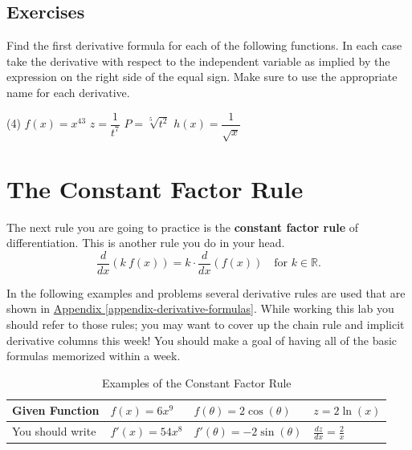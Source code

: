 \documentclass[10pt,oneside,]{book}
\newcommand{\terminology}[1]{\textbf{#1}}
\theoremstyle{plain}
\theoremstyle{definition}
\numberwithin{equation}{section}
\newcommand{\reals}{\mathbb{R}}
\newcommand{\fe}[2]{#1\mathopen{}\left(#2\right)\mathclose{}}
\newcommand{\fd}[1]{#1'}
\newcommand{\lz}[2]{\frac{d#1}{d#2}}
\newcommand{\lzoo}[2]{{\frac{d}{d#1}}{\left(#2\right)}}
\begin{document}
\subsection[Exercises]{Exercises}\label{exercises-33}
\hypertarget{exercisegroup-72}{\null}Find the first derivative formula for each of the following functions.  In each case take the derivative with respect to the independent variable as implied by the expression on the right side of the equal sign.  Make sure to use the appropriate name for each derivative.%
\par
\begin{exercisegroup}(4)
\exercise[1.]\hypertarget{exercise-353}{\null}\(\fe{f}{x}=x^{43}\)%
\exercise[2.]\hypertarget{exercise-354}{\null}\(z=\dfrac{1}{t^{7}}\)%
\exercise[3.]\hypertarget{exercise-355}{\null}\(P=\sqrt[5]{t^2}\)%
\exercise[4.]\hypertarget{exercise-356}{\null}\(\fe{h}{x}=\dfrac{1}{\sqrt{x}}\)%
\end{exercisegroup}
\par\smallskip\noindent
\typeout{************************************************}
\typeout{************************************************}
\section[The Constant Factor Rule]{The Constant Factor Rule}\label{section-constant-factor-rule}
The next rule you are going to practice is the \terminology{constant factor rule} of differentiation.  This is another rule you do in your head. \begin{equation}\lzoo{x}{k\ \fe{f}{x}}=k\cdot\lzoo{x}{\fe{f}{x}}\quad\text{for }k\in\reals\text{.}\label{men-3}\end{equation}%
\par
In the following examples and problems several derivative rules are used that are shown in \hyperref[appendix-derivative-formulas]{Appendix \ref{appendix-derivative-formulas}}.  While working this lab you should refer to those rules; you may want to cover up the chain rule and implicit derivative columns this week!  You should make a goal of having all of the basic formulas memorized within a week.%
\begin{table}
\centering
\caption{Examples of the Constant Factor Rule\label{table-constant-factor-rule}}
\begin{tabular}{l|l|l|l}
\toprule
Given Function&\(\fe{f}{x}=6x^9\)&\(\fe{f}{\theta}=2\fe{\cos}{\theta}\)&\(z=2\fe{\ln}{x}\)\\
\midrule
You should write&\(\fe{\fd{f}}{x}=54x^8\)&\(\fe{\fd{f}}{\theta}=-2\fe{\sin}{\theta}\)&\(\lz{z}{x}=\frac{2}{x}\)\\
\bottomrule
\end{tabular}
\end{table}
\typeout{************************************************}
\typeout{************************************************}
\end{document}

